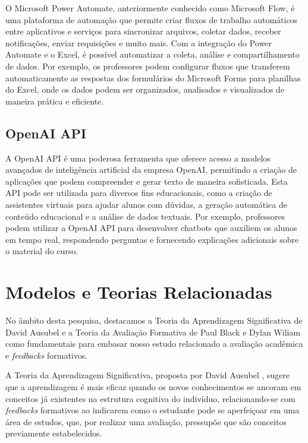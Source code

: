 O Microsoft Power Automate, anteriormente conhecido como Microsoft Flow, é uma plataforma de automação que permite criar fluxos de trabalho automáticos entre aplicativos e serviços para sincronizar arquivos, coletar dados, receber notificações, enviar requisições e muito mais. Com a integração do Power Automate e o Excel, é possível automatizar a coleta, análise e compartilhamento de dados. Por exemplo, os professores podem configurar fluxos que transferem automaticamente as respostas dos formulários do Microsoft Forms para planilhas do Excel, onde os dados podem ser organizados, analisados e visualizados de maneira prática e eficiente.

\subsection{OpenAI API}

A OpenAI API é uma poderosa ferramenta que oferece acesso a modelos avançados de inteligência artificial da empresa OpenAI, permitindo a criação de aplicações que podem compreender e gerar texto de maneira sofisticada. Esta API pode ser utilizada para diversos fins educacionais, como a criação de assistentes virtuais para ajudar alunos com dúvidas, a geração automática de conteúdo educacional e a análise de dados textuais. Por exemplo, professores podem utilizar a OpenAI API para desenvolver chatbots que auxiliem os alunos em tempo real, respondendo perguntas e fornecendo explicações adicionais sobre o material do curso.

\section{Modelos e Teorias Relacionadas}

No âmbito desta pesquisa, destacamos a Teoria da Aprendizagem Significativa de David Ausubel \cite{teorias} e a Teoria da Avaliação Formativa de Paul Black e Dylan Wiliam \cite{domingos2006} como fundamentais para embasar nosso estudo relacionado a avaliação acadêmica e \textit{feedbacks} formativos.

A Teoria da Aprendizagem Significativa, proposta por David Ausubel \cite{teorias}, sugere que a aprendizagem é mais eficaz quando os novos conhecimentos se ancoram em conceitos já existentes na estrutura cognitiva do indivíduo, relacionando-se com \textit{feedbacks} formativos ao indicarem como o estudante pode se aperfeiçoar em uma área de estudos, que, por realizar uma avaliação, pressupõe que são conceitos previamente estabelecidos.

